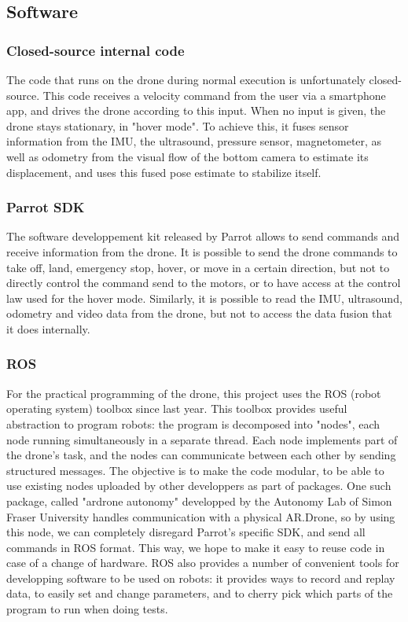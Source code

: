 \subsection{Software}

\subsubsection{Closed-source internal code}
The code that runs on the drone during normal execution is unfortunately closed-source. This code receives a velocity command from the user via a smartphone app, and drives the drone according to this input. When no input is given, the drone stays stationary, in "hover mode". To achieve this, it fuses sensor information from the IMU, the ultrasound, pressure sensor, magnetometer, as well as odometry from the visual flow of the bottom camera to estimate its displacement, and uses this fused pose estimate to stabilize itself.

\subsubsection{Parrot SDK}
The software developpement kit released by Parrot allows to send commands and receive information from the drone. It is possible to send the drone commands to take off, land, emergency stop, hover, or move in a certain direction, but not to directly control the command send to the motors, or to have access at the control law used for the hover mode. Similarly, it is possible to read the IMU, ultrasound, odometry and video data from the drone, but not to access the data fusion that it does internally.

\subsubsection{ROS}
\label{sssec:ROS}
For the practical programming of the drone, this project uses the ROS (robot operating system) toolbox since last year. This toolbox provides useful abstraction to program robots: the program is decomposed into "nodes", each node running simultaneously in a separate thread. Each node implements part of the drone's task, and the nodes can communicate between each other by sending structured messages. The objective is to make the code modular, to be able to use existing nodes uploaded by other developpers as part of packages. One such package, called "ardrone autonomy" developped by the Autonomy Lab of Simon Fraser University handles communication with a physical AR.Drone, so by using this node, we can completely disregard Parrot's specific SDK, and send all commands in ROS format. This way, we hope to make it easy to reuse code in case of a change of hardware. ROS also provides a number of convenient tools for developping software to be used on robots: it provides ways to record and replay data, to easily set and change parameters, and to cherry pick which parts of the program to run when doing tests.

